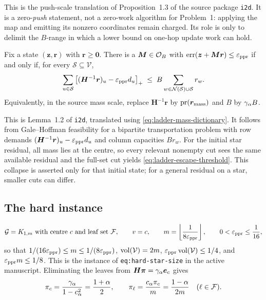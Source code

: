 \noindent
This is the push-scale translation of Proposition~1.3 of the source package
\texttt{i2d}. It is a zero-\emph{push} statement, not a zero-work algorithm
for Problem~1: applying the map and emitting its nonzero coordinates remain
charged. Its role is only to delimit the $B$-range in which a lower bound on
one-hop update work can hold.

\begin{proposition}
\label{prop:ladder-transport}
Fix a state $(\bm{z},\bm{r})$ with $\bm{r}\ge\bm{0}$. There is a
$\bm{M}\in\mathcal{O}_{B}$ with
$\operatorname{err}(\bm{z}+\bm{M}\bm{r})\le\varepsilon_{\mathrm{ppr}}$ if and only if, for every
$\mathcal{S}\subseteq\mathcal{V}$,
\begin{equation}
    \sum_{u\in\mathcal{S}}
      \left[(\bm{H}^{-1}\bm{r})_u-\varepsilon_{\mathrm{ppr}} d_u\right]_{+}
    \;\le\;
    B\sum_{w\in\mathcal N(\mathcal{S})\cup\mathcal{S}}r_w .
    \label{eq:ladder-transport-cut}
\end{equation}
Equivalently, in the source mass scale, replace
$\bm{H}^{-1}\bm{r}$ by $\operatorname{pr}(\bm{r}_{\mathrm{mass}})$ and $B$ by
$\gamma_{\alpha} B$.
\end{proposition}

\noindent
This is Lemma~1.2 of \texttt{i2d}, translated using
\eqref{eq:ladder-mass-dictionary}. It follows from Gale--Hoffman feasibility
for a bipartite transportation problem with row demands
$(\bm{H}^{-1}\bm{r})_u-\varepsilon_{\mathrm{ppr}} d_u$ and column capacities $Br_w$.
For the initial star residual, all mass lies at the centre, so every relevant
nonempty cut sees the same available residual and the full-set cut yields
\eqref{eq:ladder-escape-threshold}. This collapse is asserted only for that
initial state; for a general residual on a star, smaller cuts can differ.

\subsection*{The hard instance}

\begin{equation}
    \mathcal{G}=K_{1,m}\ \text{with centre }c
    \text{ and leaf set }\mathcal{F},
    \qquad
    v=c,
    \qquad
    m=\left\lfloor \frac{1}{8\varepsilon_{\mathrm{ppr}}} \right\rfloor,
    \qquad
    0<\varepsilon_{\mathrm{ppr}}\le\frac{1}{16},
    \label{eq:ladder-hard-instance}
\end{equation}
so that $1/(16\varepsilon_{\mathrm{ppr}})\le m\le1/(8\varepsilon_{\mathrm{ppr}})$,
$\operatorname{vol}(\mathcal V)=2m$, $\varepsilon_{\mathrm{ppr}}\operatorname{vol}(\mathcal V)\le1/4$, and
$\varepsilon_{\mathrm{ppr}} m\le1/8$. This is the instance of
\texttt{eq:hard-star-size} in the active manuscript. Eliminating the leaves
from $\bm{H}\bm{\pi}=\gamma_{\alpha}\bm{e}_c$ gives
\begin{equation}
    \pi_c=\frac{\gamma_{\alpha}}{1-c_{\alpha}^2}=\frac{1+\alpha}{2},
    \qquad
    \pi_\ell=\frac{c_{\alpha}\pi_c}{m}=\frac{1-\alpha}{2m}
    \quad(\ell\in\mathcal F).
    \label{eq:ladder-star-closed-forms}
\end{equation}

